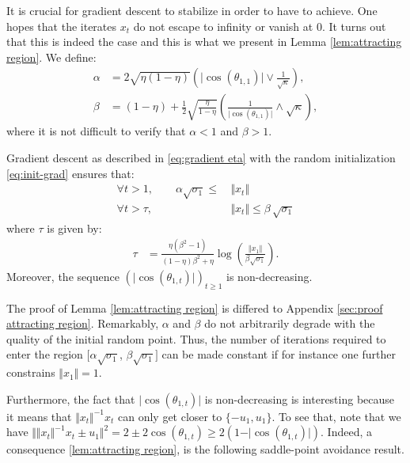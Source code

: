 It is crucial for gradient descent to stabilize in order to have to achieve. One hopes that the iterates $x_t$ do not escape to infinity or vanish at $0$. It turns out that this is indeed the case and this is what we present in Lemma \ref{lem:attracting region}. We define: 
\begin{align}
    \alpha & =   2\sqrt{\eta(1 - \eta)} \left(\vert \cos(\theta_{1,1}) \vert \vee  \frac{1}{\sqrt{\kappa}}\right),  \\
    \beta  & =  (1-\eta) + \frac{1}{2}\sqrt{\frac{\eta}{1-\eta}} \left(\frac{1}{\vert \cos(\theta_{1,1}) \vert } \wedge  \sqrt{\kappa} \right),
\end{align}
where it is not difficult to verify that $\alpha < 1$ and $\beta > 1$. 
\begin{lemma}\label{lem:attracting region}
Gradient descent as described in \eqref{eq:gradient eta} with the random initialization \eqref{eq:init-grad} ensures that:
\begin{align}
    \forall t > 1, \qquad   \alpha \sqrt{\sigma_1}  \le \, &    \Vert x_{t} \Vert  \phantom{\le \beta \, \sqrt{\sigma_1}} \\
   \forall t > \tau, \, \qquad   \phantom{\alpha  \sqrt{\sigma_1} \le}  & \Vert x_{t} \Vert \le \beta \, \sqrt{\sigma_1}    
\end{align}
where $\tau$ is given by:
\begin{align}
    \tau & =   \frac{\eta (\beta^2 - 1)}{(1- \eta) \beta^2  + \eta }   \log\left(\frac{\Vert x_1 \Vert}{\beta \sqrt{\sigma_1}}\right). 
\end{align}
Moreover, the sequence $(\vert \cos(\theta_{1,t})\vert )_{t\ge 1}$ is non-decreasing.
\end{lemma}
The proof of Lemma \ref{lem:attracting region} is differed to Appendix \ref{sec:proof attracting region}. Remarkably, $\alpha$ and $\beta$ do not arbitrarily degrade with the quality of the initial random point. Thus, the number of iterations required to enter the region $[\alpha \sqrt{\sigma_1}$, $\beta \sqrt{\sigma_1}]$ can be made constant if for instance one further constrains $\Vert x_1 \Vert = 1$. 

Furthermore, the fact that $\vert \cos(\theta_{1,t})\vert$ is non-decreasing is interesting because it means that $\Vert x_t \Vert^{-1} x_t$ can only get closer to $\lbrace -u_1 , u_1 \rbrace$. To see that, note that we have $\Vert \Vert x_t \Vert^{-1} x_t \pm u_1 \Vert^2 = 2 \pm 2 \cos(\theta_{1, t}) \ge 2 (1 - \vert \cos(\theta_{1, t})\vert )$.  Indeed, a consequence \ref{lem:attracting region}, is the following saddle-point avoidance result. 

